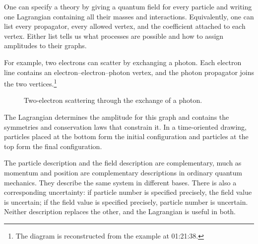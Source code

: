 One can specify a theory by giving a quantum field for every particle and writing one Lagrangian containing all their masses and interactions. Equivalently, one can list every propagator, every allowed vertex, and the coefficient attached to each vertex. Either list tells us what processes are possible and how to assign amplitudes to their graphs.

For example, two electrons can scatter by exchanging a photon. Each electron line contains an electron--electron--photon vertex, and the photon propagator joins the two vertices.\footnote{The diagram is reconstructed from the example at 01:21:38.}

\begin{figure}[htbp]
\centering
{}
\caption{Two-electron scattering through the exchange of a photon.}
\end{figure}

The Lagrangian determines the amplitude for this graph and contains the symmetries and conservation laws that constrain it. In a time-oriented drawing, particles placed at the bottom form the initial configuration and particles at the top form the final configuration.

\begin{classroomqa}
\end{classroomqa}

The particle description and the field description are complementary, much as momentum and position are complementary descriptions in ordinary quantum mechanics. They describe the same system in different bases. There is also a corresponding uncertainty: if particle number is specified precisely, the field value is uncertain; if the field value is specified precisely, particle number is uncertain. Neither description replaces the other, and the Lagrangian is useful in both.

